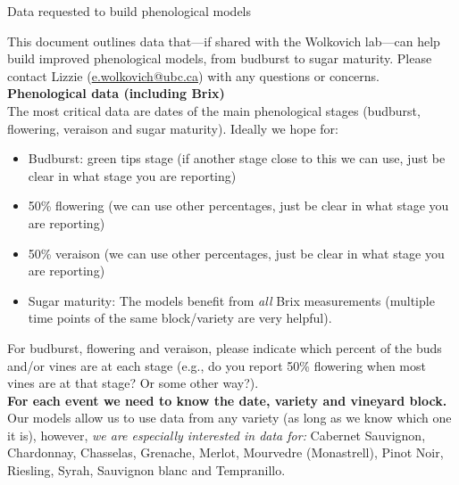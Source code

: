 \documentclass[11pt,letter]{article}
\newenvironment{smitemize}{
\begin{itemize}
  \setlength{\itemsep}{1pt}
  \setlength{\parskip}{0pt}
  \setlength{\parsep}{0pt}}
{\end{itemize}
}
\begin{document}

\renewcommand{\refname}{\CHead{}}

\begin{center}
{\Large Data requested to build phenological models}
\end{center}
This document outlines data that---if shared with the Wolkovich lab---can help build improved phenological models, from budburst to sugar maturity. Please contact Lizzie (\url{e.wolkovich@ubc.ca}) with any questions or concerns.\\

{\bf Phenological data (including Brix)}\\

The most critical data are dates of the main phenological stages (budburst, flowering, veraison and sugar maturity). Ideally we hope for:
\begin{smitemize}
\item Budburst: green tips stage (if another stage close to this we can use, just be clear in what stage you are reporting)
\item 50\% flowering (we can use other percentages, just be clear in what stage you are reporting)
\item 50\% veraison (we can use other percentages, just be clear in what stage you are reporting)
\item Sugar maturity: The models benefit from \emph{all} Brix measurements (multiple time points of the same block/variety are very helpful). 
\end{smitemize}
For budburst, flowering and veraison, please indicate which percent of the buds and/or vines are at each stage (e.g., do you report 50\% flowering when most vines are at that stage? Or some other way?).
\vspace{2ex}\\
{\bf For each event we need to know the date, variety and vineyard block.}
\vspace{2ex}\\
Our models allow us to use data from any variety (as long as we know which one it is), however, \emph{we are especially interested in data for:} Cabernet Sauvignon, Chardonnay, Chasselas, Grenache, Merlot, Mourvedre (Monastrell), Pinot Noir, Riesling, Syrah, Sauvignon blanc and Tempranillo.\\
\end{document}

